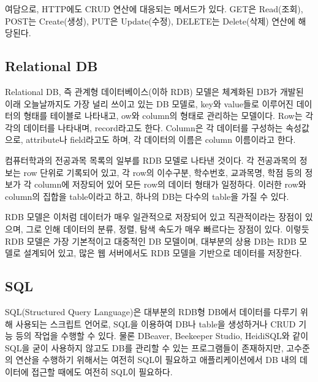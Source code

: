 여담으로, HTTP에도 CRUD 연산에 대응되는 메서드가 있다. GET은 Read(조회), POST는 Create(생성), PUT은 Update(수정), DELETE는 Delete(삭제) 연산에 해당된다.
\newpage

\subsection*{Relational DB}

Relational DB, 즉 관계형 데이터베이스(이하 RDB) 모델은 체계화된 DB가 개발된 이래 오늘날까지도 가장 널리 쓰이고 있는 DB 모델로, key와 value들로 이루어진 데이터의 형태를 테이블로 나타내고, ow와 column의 형태로 관리하는 모델이다. Row는 각각의 데이터를 나타내며, record라고도 한다. Column은 각 데이터를 구성하는 속성값으로, attribute나 field라고도 하며, 각 데이터의 이름은 column 이름이라고 한다.


\은 컴퓨터학과의 전공과목 목록의 일부를 RDB 모델로 나타낸 것이다. 각 전공과목의 정보는 row 단위로 기록되어 있고, 각 row의 이수구분, 학수번호, 교과목명, 학점 등의 정보가 각 column에 저장되어 있어 모든 row의 데이터 형태가 일정하다. 이러한 row와 column의 집합을 table이라고 하고, 하나의 DB는 다수의 table을 가질 수 있다.

RDB 모델은 이처럼 데이터가 매우 일관적으로 저장되어 있고 직관적이라는 장점이 있으며, 그로 인해 데이터의 분류, 정렬, 탐색 속도가 매우 빠르다는 장점이 있다. 이렇듯 RDB 모델은 가장 기본적이고 대중적인 DB 모델이며, 대부분의 상용 DB는 RDB 모델로 설계되어 있고, 많은 웹 서버에서도 RDB 모델을 기반으로 데이터를 저장한다.

\subsection*{SQL}

SQL(Structured Query Language)은 대부분의 RDB형 DB에서 데이터를 다루기 위해 사용되는 스크립트 언어로, SQL을 이용하여 DB나 table을 생성하거나 CRUD 기능 등의 작업을 수행할 수 있다. 물론 DBeaver, Beekeeper Studio, HeidiSQL와 같이 SQL을 굳이 사용하지 않고도 DB를 관리할 수 있는 프로그램들이 존재하지만, 고수준의 연산을 수행하기 위해서는 여전히 SQL이 필요하고 애플리케이션에서 DB 내의 데이터에 접근할 때에도 여전히 SQL이 필요하다.

